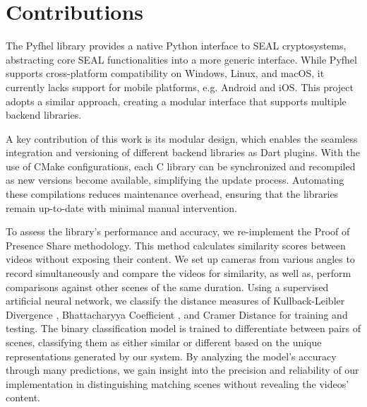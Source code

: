 \section{Contributions}
The Pyfhel library \cite{Ibarrondo2021-Pyfhel} provides a native Python interface to SEAL cryptosystems, abstracting core SEAL functionalities into a more generic interface. While Pyfhel supports cross-platform compatibility on Windows, Linux, and macOS, it currently lacks support for mobile platforms, e.g. Android and iOS. This project adopts a similar approach, creating a modular interface that supports multiple backend libraries.

A key contribution of this work is its modular design, which enables the seamless integration and versioning of different backend libraries as Dart plugins. With the use of CMake configurations, each C library can be synchronized and recompiled as new versions become available, simplifying the update process. Automating these compilations reduces maintenance overhead, ensuring that the libraries remain up-to-date with minimal manual intervention.

To assess the library's performance and accuracy, we re-implement the Proof of Presence Share \cite{Lagesse2021-PopShare} methodology. This method calculates similarity scores between videos without exposing their content. We set up cameras from various angles to record simultaneously and compare the videos for similarity, as well as, perform comparisons against other scenes of the same duration. Using a supervised artificial neural network, we classify the distance measures of Kullback-Leibler Divergence \cite{Kullback1951-bg}, Bhattacharyya Coefficient \cite{Bhattacharyya1933-fw}, and Cramer Distance \cite{Cramer1928-sw} for training and testing. The binary classification model is trained to differentiate between pairs of scenes, classifying them as either similar or different based on the unique representations generated by our system. By analyzing the model’s accuracy through many predictions, we gain insight into the precision and reliability of our implementation in distinguishing matching scenes without revealing the videos’ content.
